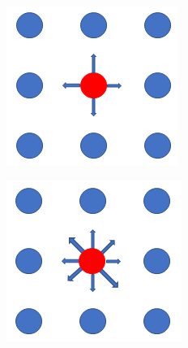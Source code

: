 \documentclass[a4paper]{article}
\begin{document}
\begin{figure}
  \centering
  \begin{minipage}{.5\textwidth}
    \centering
    \includegraphics[width=.4\linewidth]{1.png}
    \label{fig:test1}
  \end{minipage}%
  \begin{minipage}{.5\textwidth}
    \centering
    \includegraphics[width=.4\linewidth]{2.png}
    \label{fig:test2}
  \end{minipage}
  \end{figure}
\end{document}
